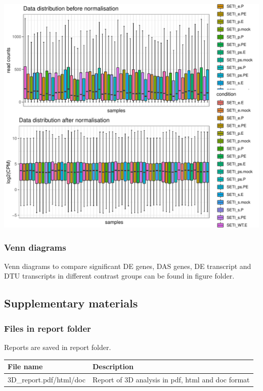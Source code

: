 \documentclass[]{article}
\begin{document}
\includegraphics[width=16.67in]{X2024.08.05.11.24.04.j284/figure/Gene expression distribution}

\subsubsection{Venn diagrams}\label{venn-diagrams}

Venn diagrams to compare significant DE genes, DAS genes, DE transcript
and DTU transcripts in different contrast groups can be found in figure
folder.

\subsection{Supplementary materials}\label{supplementary-materials}

\subsubsection{Files in report folder}\label{files-in-report-folder}

Reports are saved in report folder.

\begin{longtable}[]{@{}ll@{}}
\toprule
File name & Description\tabularnewline
\midrule
\endhead
3D\_report.pdf/html/doc & Report of 3D analysis in pdf, html and doc
format\tabularnewline
\bottomrule
\end{longtable}
\end{document}
